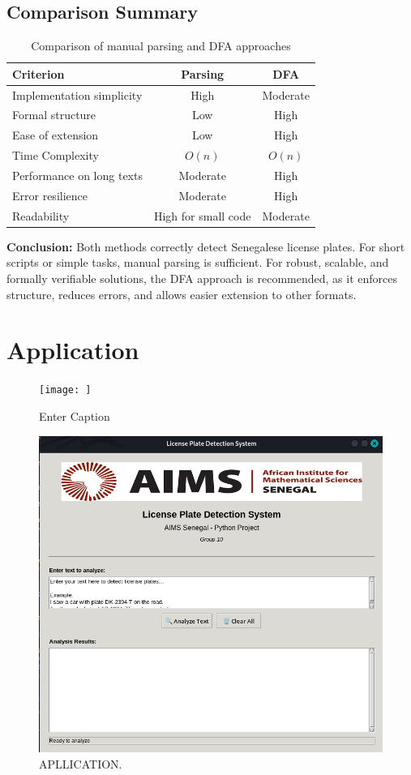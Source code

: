 \documentclass[12pt,a4paper]{article}
\begin{document}
\subsection{Comparison Summary}

\begin{table}[H]
\centering
\begin{tabular}{lcc}
\toprule
\textbf{Criterion} & \textbf{Parsing} & \textbf{DFA} \\
\midrule
Implementation simplicity & High & Moderate \\
Formal structure & Low & High \\
Ease of extension & Low & High \\
Time Complexity & $O(n)$ & $O(n)$ \\ 
Performance on long texts & Moderate & High \\
Error resilience & Moderate & High \\
Readability & High for small code & Moderate \\
\bottomrule
\end{tabular}
\caption{Comparison of manual parsing and DFA approaches}
\label{tab:comparison}
\end{table}

\textbf{Conclusion:} Both methods correctly detect Senegalese license plates. For short scripts or simple tasks, manual parsing is sufficient. For robust, scalable, and formally verifiable solutions, the DFA approach is recommended, as it enforces structure, reduces errors, and allows easier extension to other formats.

\newpage
\section{Application}

\begin{figure}
    \centering
    \texttt{[image: ]}
    \caption{Enter Caption}
    \label{fig:placeholder}
\end{figure}

\begin{figure}[H]
    \centering
    \includegraphics[width=\linewidth]{AIMS_Senegal__Assignment_template/app.png}
    \caption{APLLICATION.}
    \label{fig:step1Parsing}
\end{figure}

\end{document}
